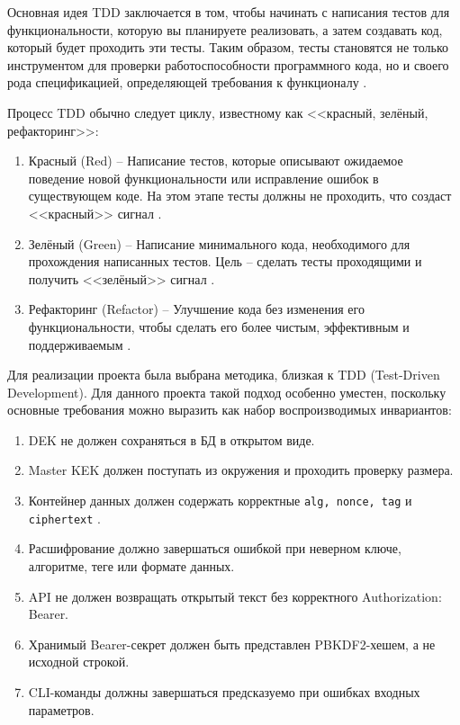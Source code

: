 \documentclass[14pt, a4paper]{extarticle}
\renewcommand{\texttt}[1]{%
  {\def\UrlFont{\ttfamily}\nolinkurl{#1}}%
}
\begin{document}
	Основная идея TDD заключается в том, чтобы начинать с написания
	тестов для функциональности, которую вы планируете реализовать, а затем
	создавать код, который будет проходить эти тесты. Таким образом, тесты
	становятся не только инструментом для проверки работоспособности
	программного кода, но и своего рода спецификацией, определяющей
	требования к функционалу \cite{Shadrinsk_TDD}.
	
	Процесс TDD обычно следует циклу, известному как <<красный, зелёный,
	рефакторинг>>:
	
	\begin{enumerate}
	\item Красный (Red) -- Написание тестов, которые описывают ожидаемое
	поведение новой функциональности или исправление ошибок в существующем
	коде. На этом этапе тесты должны не проходить, что создаст <<красный>> сигнал \cite{Shadrinsk_TDD}.
	\item Зелёный (Green) -- Написание минимального кода, необходимого
	для прохождения написанных тестов. Цель -- сделать тесты проходящими и
	получить <<зелёный>> сигнал \cite{Shadrinsk_TDD}.
	\item Рефакторинг (Refactor) -- Улучшение кода без изменения его
	функциональности, чтобы сделать его более чистым, эффективным и
	поддерживаемым \cite{Shadrinsk_TDD}.
	\end{enumerate}
		
	Для реализации проекта была выбрана методика, близкая к TDD (Test-Driven Development). Для данного проекта такой подход особенно уместен, поскольку основные требования можно выразить как набор воспроизводимых инвариантов:
	
	\begin{enumerate}
	\item DEK не должен сохраняться в БД в открытом виде.
	\item Master KEK должен поступать из окружения и проходить проверку размера.
	\item Контейнер данных должен содержать корректные \texttt{alg, nonce, tag} и \texttt{ciphertext}.
	\item Расшифрование должно завершаться ошибкой при неверном ключе, алгоритме, теге или формате данных.
	\item API не должен возвращать открытый текст без корректного Authorization: Bearer.
	\item Хранимый Bearer-секрет должен быть представлен PBKDF2-хешем, а не исходной строкой.
	\item CLI-команды должны завершаться предсказуемо при ошибках входных параметров.
	\end{enumerate}
	
\end{document}
